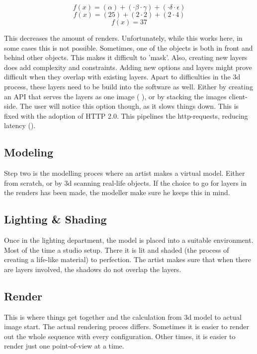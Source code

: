 \[ f(x) = (\alpha) + (\cdot \beta \cdot \gamma) + (\cdot \delta \cdot \epsilon)\]
\[ f(x) = (25) + (2 \cdot 2) + (2 \cdot 4)\]
\[ f(x) = 37\]

This decreases the amount of renders. Unfortunately, while this works here, in some cases this is not possible. Sometimes, one of the objects is both in front and behind other objects. This makes it difficult to 'mask'. Also, creating new layers does add complexity and constraints. Adding new options and layers might prove difficult when they overlap with existing layers.
\newline
Apart to difficulties in the 3d process, these layers need to be build into the software as well. Either by creating an API that serves the layers as one image (\citet{Bugaboo} ), or by stacking the images client-side. The user will notice this option though, as it slows things down. This is fixed with the adoption of HTTP 2.0. This pipelines the http-requests, reducing latency (\citet{latency}).

\subsection{Modeling}
Step two is the modelling proces where an artist makes a virtual model. Either from scratch, or by 3d scanning real-life objects. If the choice to go for layers in the renders has been made, the modeller make sure he keeps this in mind.

\subsection{Lighting \& Shading}
Once in the lighting department, the model is placed into a suitable environment. Most of the time a studio setup. There it is lit and shaded (the process of creating a life-like material) to perfection. The artist makes sure that when there are layers involved, the shadows do not overlap the layers.
\subsection{Render}
This is where things get together and the calculation from 3d model to actual image start. The actual rendering proces differs. Sometimes it is easier to render out the whole sequence with every configuration. Other times, it is easier to render just one point-of-view at a time.


